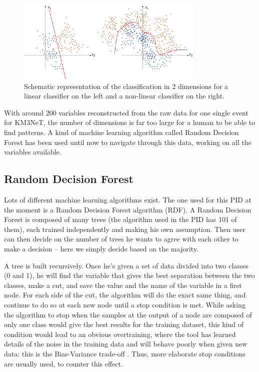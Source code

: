 \begin{figure}[h!]
    \centering
    \includegraphics[width=0.8\textwidth]{fig/Classification_2D_comparison.png}
    \caption{Schematic representation of the classification in 2 dimensions for a linear classifier on the left and a non-linear classifier on the right.}
    \label{fig:NUIO}
\end{figure}

With around 200 variables reconstructed from the raw data for one single event for KM3NeT, the number of dimensions is far too large for a human to be able to find patterns. A kind of machine learning algorithm called Random Decision Forest has been used until now to navigate through this data, working on all the variables available.

\subsection{Random Decision Forest}

Lots of different machine learning algorithms exist. The one used for this PID at the moment is a Random Decision Forest algorithm (RDF). A Random Decision Forest is composed of many trees (the algorithm used in the PID has 101 of them), each trained independently and making his own assumption. Then user can then decide on the number of trees he wants to agree with each other to make a decision -- here we simply decide based on the majority.

A tree is built recursively. Once he’s given a set of data divided into two classes (0 and 1), he will find the variable that gives the best separation between the two classes, make a cut, and save the value and the name of the variable in a first node. For each side of the cut, the algorithm will do the exact same thing, and continue to do so at each new node until a stop condition is met. While asking the algorithm to stop when the samples at the output of a node are composed of only one class would give the best results for the training dataset, this kind of condition would lead to an obvious overtraining, where the tool has learned details of the noise in the training data and will behave poorly when given new data: this is the Bias-Variance trade-off \citep{hastie_09_elements-of.statistical-learning}. Thus, more elaborate stop conditions are usually used, to counter this effect.

